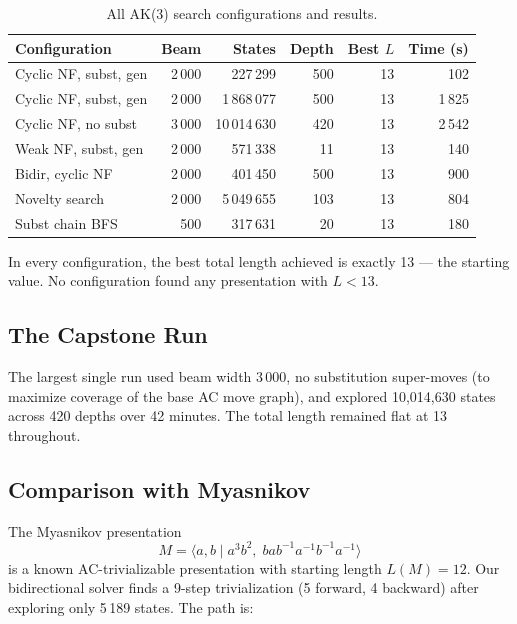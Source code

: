 \documentclass[12pt,a4paper]{article}
\begin{document}
\begin{table}[htbp]
\centering
\caption{All AK(3) search configurations and results.}
\label{tab:results}
\begin{tabular}{@{}lrrrrr@{}}
\toprule
Configuration & Beam & States & Depth & Best $L$ & Time (s) \\
\midrule
Cyclic NF, subst, gen & 2\,000 & 227\,299 & 500 & 13 & 102 \\
Cyclic NF, subst, gen & 2\,000 & 1\,868\,077 & 500 & 13 & 1\,825 \\
Cyclic NF, no subst & 3\,000 & 10\,014\,630 & 420 & 13 & 2\,542 \\
Weak NF, subst, gen & 2\,000 & 571\,338 & 11 & 13 & 140 \\
Bidir, cyclic NF & 2\,000 & 401\,450 & 500 & 13 & 900 \\
Novelty search & 2\,000 & 5\,049\,655 & 103 & 13 & 804 \\
Subst chain BFS & 500 & 317\,631 & 20 & 13 & 180 \\
\bottomrule
\end{tabular}
\end{table}

In every configuration, the best total length achieved is exactly 13 --- the starting value. No configuration found any presentation with $L < 13$.

\subsection{The Capstone Run}

The largest single run used beam width 3\,000, no substitution super-moves (to maximize coverage of the base AC move graph), and explored 10,014,630 states across 420 depths over 42 minutes. The total length remained flat at 13 throughout.

\subsection{Comparison with Myasnikov}

The Myasnikov presentation
\[
M = \langle a,b \mid a^3 b^2,\; b a b^{-1} a^{-1} b^{-1} a^{-1} \rangle
\]
is a known AC-trivializable presentation with starting length $L(M) = 12$. Our bidirectional solver finds a 9-step trivialization (5 forward, 4 backward) after exploring only 5\,189 states. The path is:
\end{document}
